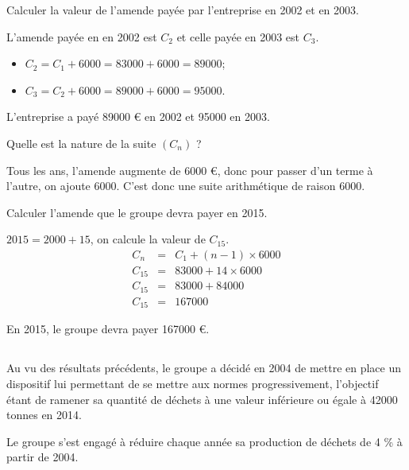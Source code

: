 \begin{questions}
	\question[1] Calculer la valeur de l'amende payée par l'entreprise en 2002 et en 2003.
		\begin{solution}
			L'amende payée en en 2002 est $C_2$ et celle payée en 2003 est $C_3$. 
			\begin{itemize}
				\item $C_2 = C_1 + \num{6000} = \num{83000} + \num{6000} = \num{89000}$;
				\item $C_3 = C_2 + \num{6000} = \num{89000} + \num{6000} = \num{95000}$.
			\end{itemize}
		
		L'entreprise a payé \num{89000} € en 2002 et \num{95000} en 2003.
		\end{solution}
	\question[1] Quelle est la nature de la suite $(C_n)$ ?
		\begin{solution}
			Tous les ans, l'amende augmente de \num{6000} €, donc pour passer d'un terme à l'autre, on ajoute \num{6000}. C'est donc une suite arithmétique de raison \num{6000}.
		\end{solution}
	\question[1] Calculer l'amende que le groupe devra payer en 2015.
		\begin{solution}
			$2015 = 2000 + 15$, on calcule la valeur de $C_{15}$.
			\begin{eqnarray*}
				C_{n} & = & C_1 + (n - 1) \times \num{6000} \\
				C_{15} & = & \num{83000} + 14 \times \num{6000} \\
				C_{15} & = & \num{83000} + \num{84000} \\
				C_{15} & = & \num{167000}
			\end{eqnarray*}
		
		En 2015, le groupe devra payer \num{167000} €.
		\end{solution}
\end{questions}

\subsection{}

Au vu des résultats précédents, le groupe a décidé en 2004 de mettre en place un dispositif lui permettant de se mettre aux normes progressivement, l'objectif étant de ramener sa quantité de déchets à une valeur inférieure ou égale à \num{42000} tonnes en 2014.

Le groupe s'est engagé à réduire chaque année sa production de déchets de 4 \% à partir de 2004.\\

